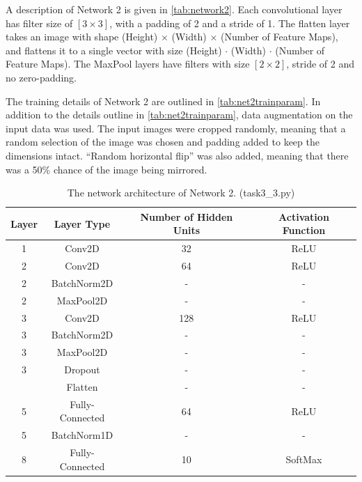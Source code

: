 \documentclass{article}
\begin{document}
A description of Network 2 is given in \autoref{tab:network2}. Each convolutional layer has filter size of $[3\times 3]$, with a padding of 2 and a stride of 1. The flatten layer takes an image with shape (Height) $\times$ (Width) $\times$ (Number of Feature Maps), and flattens
it to a single vector with size (Height) $\cdot$ (Width) $\cdot$ (Number of Feature Maps). The MaxPool layers have filters with size $[2\times2]$, stride of 2 and no zero-padding.

The training details of Network 2 are outlined in \autoref{tab:net2trainparam}. In addition to the details outline in \autoref{tab:net2trainparam}, data augmentation on the input data was used. The input images were cropped randomly, meaning that a random selection of the image was chosen and padding added to keep the dimensions intact. ``Random horizontal flip'' was also added, meaning that there was a 50\% chance of the image being mirrored.   

\begin{table}[H]
\centering
\caption{The network architecture of Network 2. (task3\_3.py)}
\label{tab:network2}
\begin{tabular}{c|c|c|c}
\textbf{Layer} & \textbf{Layer Type} & \textbf{Number of Hidden Units} & \textbf{Activation Function} \\ \hline
1 & Conv2D & 32 & ReLU \\
2 & Conv2D & 64 & ReLU \\
2 & BatchNorm2D & - & - \\
2 & MaxPool2D & - & - \\
3 & Conv2D & 128 & ReLU \\
3 & BatchNorm2D & - & - \\
3 & MaxPool2D & - & - \\
3 & Dropout & - & - \\\hline

 & Flatten & - & - \\
5 & Fully-Connected & 64 & ReLU \\
5 & BatchNorm1D & - & - \\
8 & Fully-Connected & 10 & SoftMax \\
\end{tabular}
\end{table}

\begin{table}[]
\centering
\caption{Training parameters used when training Network 2.}
\label{tab:net2trainparam}
\end{table}
\end{document}

